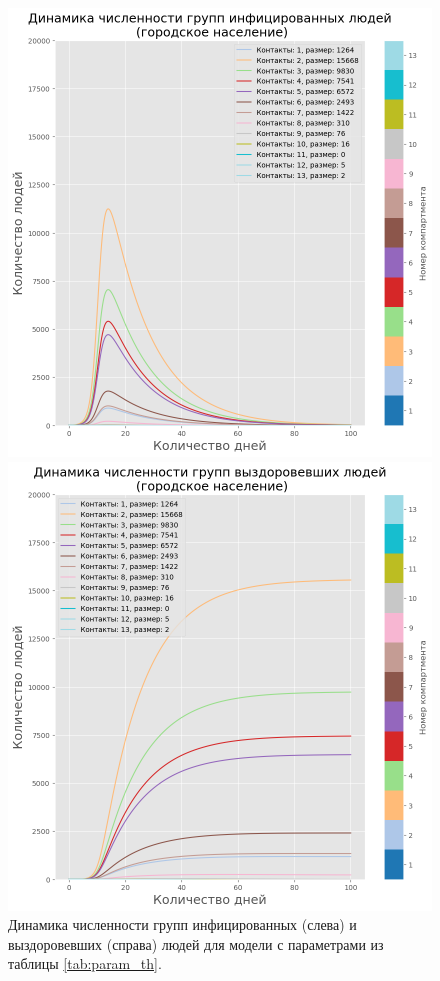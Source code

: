 \documentclass[14pt,a4paper]{article}
\begin{document}
\begin{figure}[h!]
	\begin{minipage}{0.5\textwidth}
		\centering
		\includegraphics[width=\linewidth]{img/sir_model_compare_I_urban_new.png}
	\end{minipage}
	\begin{minipage}{0.5\textwidth}
		\centering
		\includegraphics[width=\linewidth]{img/sir_model_compare_R_urban_new.png}
	\end{minipage}
	\caption{Динамика численности групп инфицированных (слева) и выздоровевших (справа) людей для модели с параметрами из таблицы \ref{tab:param_th}.}
	\label{fig:RI}
\end{figure}
\end{document}
